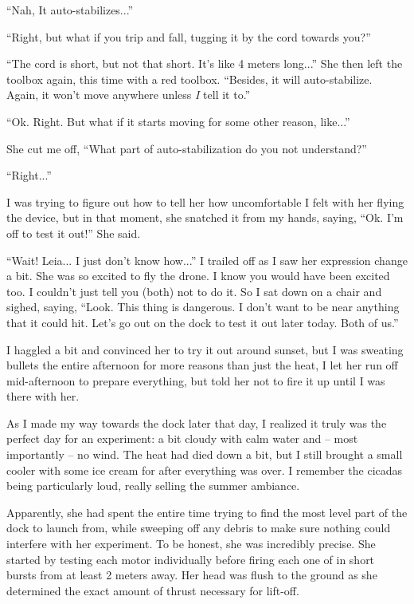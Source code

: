 ``Nah, It auto-stabilizes...''

``Right, but what if you trip and fall, tugging it by the cord towards you?''

``The cord is short, but not that short. It's like 4 meters long...'' She then left the toolbox again, this time with a red toolbox. ``Besides, it will auto-stabilize. Again, it won't move anywhere unless \textit{I} tell it to.''

``Ok. Right. But what if it starts moving for some other reason, like...''

She cut me off, ``What part of auto-stabilization do you not understand?''

``Right...''

I was trying to figure out how to tell her how uncomfortable I felt with her flying the device, but in that moment, she snatched it from my hands, saying,
``Ok. I'm off to test it out!'' She said.

``Wait! Leia... I just don't know how...'' I trailed off as I saw her expression change a bit. She was so excited to fly the drone. I know you would have been excited too. I couldn't just tell you (both) not to do it.
So I sat down on a chair and sighed, saying, ``Look. This thing is dangerous. I don't want to be near anything that it could hit. Let's go out on the dock to test it out later today. Both of us.''

I haggled a bit and convinced her to try it out around sunset, but I was sweating bullets the entire afternoon for more reasons than just the heat,
I let her run off mid-afternoon to prepare everything, but told her not to fire it up until I was there with her.

As I made my way towards the dock later that day, I realized it truly was the perfect day for an experiment: a bit cloudy with calm water and -- most importantly -- no wind.
The heat had died down a bit, but I still brought a small cooler with some ice cream for after everything was over.
I remember the cicadas being particularly loud, really selling the summer ambiance.

Apparently, she had spent the entire time trying to find the most level part of the dock to launch from, while sweeping off any debris to make sure nothing could interfere with her experiment.
To be honest, she was incredibly precise.
She started by testing each motor individually before firing each one of in short bursts from at least 2 meters away.
Her head was flush to the ground as she determined the exact amount of thrust necessary for lift-off.

